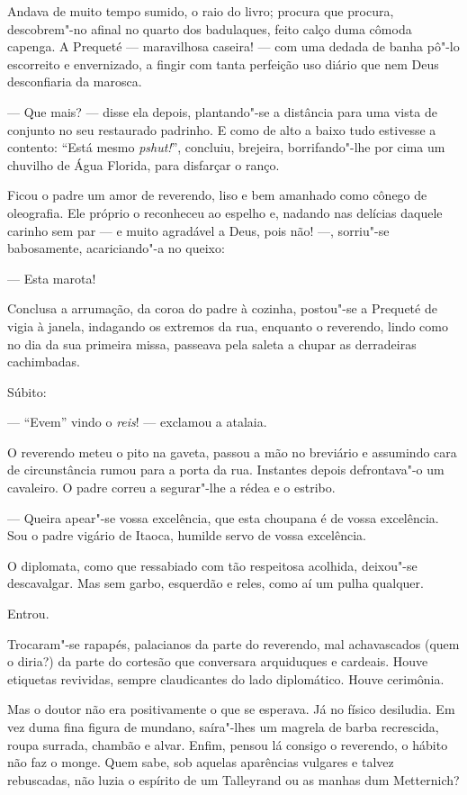 Andava de muito tempo sumido, o raio do livro; procura que procura,
descobrem"-no afinal no quarto dos badulaques, feito calço duma cômoda
capenga. A Prequeté --- maravilhosa caseira! --- com uma dedada de banha
pô"-lo escorreito e envernizado, a fingir com tanta perfeição uso diário
que nem Deus desconfiaria da marosca.

--- Que mais? --- disse ela depois, plantando"-se a distância para uma
vista de conjunto no seu restaurado padrinho. E como de alto a baixo
tudo estivesse a contento: ``Está mesmo \emph{pshut!}'', concluiu,
brejeira, borrifando"-lhe por cima um chuvilho de Água Florida, para
disfarçar o ranço.

Ficou o padre um amor de reverendo, liso e bem amanhado como cônego de
oleografia. Ele próprio o reconheceu ao espelho e, nadando nas delícias
daquele carinho sem par --- e muito agradável a Deus, pois não! ---,
sorriu"-se babosamente, acariciando"-a no queixo:

--- Esta marota!

Conclusa a arrumação, da coroa do padre à cozinha, postou"-se a Prequeté
de vigia à janela, indagando os extremos da rua, enquanto o reverendo,
lindo como no dia da sua primeira missa, passeava pela saleta a chupar
as derradeiras cachimbadas.

Súbito:

--- ``Evem'' vindo o \emph{reis}! --- exclamou a atalaia.

O reverendo meteu o pito na gaveta, passou a mão no breviário e
assumindo cara de circunstância rumou para a porta da rua. Instantes
depois defrontava"-o um cavaleiro. O padre correu a segurar"-lhe a rédea e
o estribo.

--- Queira apear"-se vossa excelência, que esta choupana é de vossa
excelência. Sou o padre vigário de Itaoca, humilde servo de vossa
excelência.

O diplomata, como que ressabiado com tão respeitosa acolhida, deixou"-se
descavalgar. Mas sem garbo, esquerdão e reles, como aí um pulha
qualquer.

Entrou.

Trocaram"-se rapapés, palacianos da parte do reverendo, mal achavascados
(quem o diria?) da parte do cortesão que conversara arquiduques e
cardeais. Houve etiquetas revividas, sempre claudicantes do lado
diplomático. Houve cerimônia.

Mas o doutor não era positivamente o que se esperava. Já no físico
desiludia. Em vez duma fina figura de mundano, saíra"-lhes um magrela de
barba recrescida, roupa surrada, chambão e alvar. Enfim, pensou lá
consigo o reverendo, o hábito não faz o monge. Quem sabe, sob aquelas
aparências vulgares e talvez rebuscadas, não luzia o espírito de um
Talleyrand ou as manhas dum Metternich?


